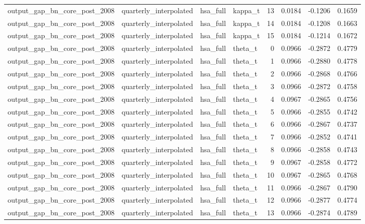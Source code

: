 \begin{tabular}{llllrrrr}
output\_gap\_bn\_core\_post\_2008 & quarterly\_interpolated & hsa\_full & kappa\_t & 13 & 0.0184 & -0.1206 & 0.1659 \\
output\_gap\_bn\_core\_post\_2008 & quarterly\_interpolated & hsa\_full & kappa\_t & 14 & 0.0184 & -0.1208 & 0.1663 \\
output\_gap\_bn\_core\_post\_2008 & quarterly\_interpolated & hsa\_full & kappa\_t & 15 & 0.0184 & -0.1214 & 0.1672 \\
output\_gap\_bn\_core\_post\_2008 & quarterly\_interpolated & hsa\_full & theta\_t & 0 & 0.0966 & -0.2872 & 0.4779 \\
output\_gap\_bn\_core\_post\_2008 & quarterly\_interpolated & hsa\_full & theta\_t & 1 & 0.0966 & -0.2880 & 0.4778 \\
output\_gap\_bn\_core\_post\_2008 & quarterly\_interpolated & hsa\_full & theta\_t & 2 & 0.0966 & -0.2868 & 0.4766 \\
output\_gap\_bn\_core\_post\_2008 & quarterly\_interpolated & hsa\_full & theta\_t & 3 & 0.0966 & -0.2872 & 0.4758 \\
output\_gap\_bn\_core\_post\_2008 & quarterly\_interpolated & hsa\_full & theta\_t & 4 & 0.0967 & -0.2865 & 0.4756 \\
output\_gap\_bn\_core\_post\_2008 & quarterly\_interpolated & hsa\_full & theta\_t & 5 & 0.0966 & -0.2855 & 0.4742 \\
output\_gap\_bn\_core\_post\_2008 & quarterly\_interpolated & hsa\_full & theta\_t & 6 & 0.0966 & -0.2867 & 0.4737 \\
output\_gap\_bn\_core\_post\_2008 & quarterly\_interpolated & hsa\_full & theta\_t & 7 & 0.0966 & -0.2852 & 0.4741 \\
output\_gap\_bn\_core\_post\_2008 & quarterly\_interpolated & hsa\_full & theta\_t & 8 & 0.0966 & -0.2858 & 0.4743 \\
output\_gap\_bn\_core\_post\_2008 & quarterly\_interpolated & hsa\_full & theta\_t & 9 & 0.0967 & -0.2858 & 0.4772 \\
output\_gap\_bn\_core\_post\_2008 & quarterly\_interpolated & hsa\_full & theta\_t & 10 & 0.0967 & -0.2865 & 0.4768 \\
output\_gap\_bn\_core\_post\_2008 & quarterly\_interpolated & hsa\_full & theta\_t & 11 & 0.0966 & -0.2867 & 0.4790 \\
output\_gap\_bn\_core\_post\_2008 & quarterly\_interpolated & hsa\_full & theta\_t & 12 & 0.0966 & -0.2877 & 0.4774 \\
output\_gap\_bn\_core\_post\_2008 & quarterly\_interpolated & hsa\_full & theta\_t & 13 & 0.0966 & -0.2874 & 0.4789 \\

\end{tabular}
